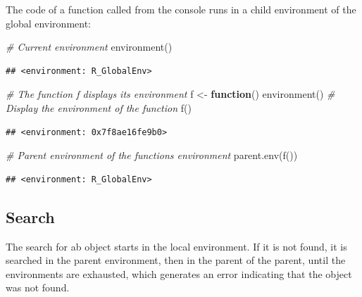 \documentclass[
  12pt,
  american,
  a4paper,
  extrafontsizes,onecolumn,openright
  ]{memoir}
\newenvironment{Shaded}{\begin{snugshade}}{\end{snugshade}}
\newcommand{\CommentTok}[1]{\textcolor[rgb]{0.56,0.35,0.01}{\textit{#1}}}
\newcommand{\ControlFlowTok}[1]{\textcolor[rgb]{0.13,0.29,0.53}{\textbf{#1}}}
\newcommand{\FunctionTok}[1]{\textcolor[rgb]{0.00,0.00,0.00}{#1}}
\newcommand{\NormalTok}[1]{#1}
\newcommand{\OtherTok}[1]{\textcolor[rgb]{0.56,0.35,0.01}{#1}}
\begin{document}
\normalsize

The code of a function called from the console runs in a child environment of the global environment:

\scriptsize

\begin{Shaded}
\begin{Highlighting}[]
\CommentTok{\# Current environment}
\FunctionTok{environment}\NormalTok{()}
\end{Highlighting}
\end{Shaded}

\begin{verbatim}
## <environment: R_GlobalEnv>
\end{verbatim}

\begin{Shaded}
\begin{Highlighting}[]
\CommentTok{\# The function f displays its environment}
\NormalTok{f }\OtherTok{\textless{}{-}} \ControlFlowTok{function}\NormalTok{() }\FunctionTok{environment}\NormalTok{()}
\CommentTok{\# Display the environment of the function}
\FunctionTok{f}\NormalTok{()}
\end{Highlighting}
\end{Shaded}

\begin{verbatim}
## <environment: 0x7f8ae16fe9b0>
\end{verbatim}

\begin{Shaded}
\begin{Highlighting}[]
\CommentTok{\# Parent environment of the function\textquotesingle{}s environment}
\FunctionTok{parent.env}\NormalTok{(}\FunctionTok{f}\NormalTok{())}
\end{Highlighting}
\end{Shaded}

\begin{verbatim}
## <environment: R_GlobalEnv>
\end{verbatim}

\normalsize

\hypertarget{search}{%
\subsection{Search}\label{search}}

The search for ab object starts in the local environment.
If it is not found, it is searched in the parent environment, then in the parent of the parent, until the environments are exhausted, which generates an error indicating that the object was not found.
\end{document}
